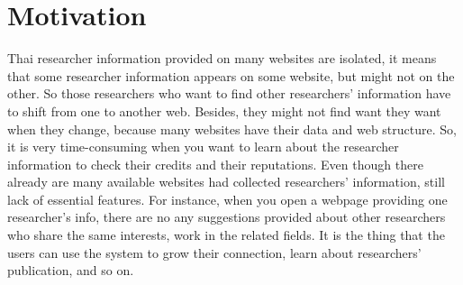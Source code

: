 \section{Motivation}
\label{sec:motivation}

Thai researcher information provided on many websites are isolated, it means that some researcher information appears on some website, but might not on the other. So those researchers who want to find other researchers' information have to shift from one to another web. Besides, they might not find want they want when they change, because many websites have their data and web structure. So, it is very time-consuming when you want to learn about the researcher information to check their credits and their reputations. Even though there already are many available websites had collected researchers' information, still lack of essential features. For instance, when you open a webpage providing one researcher's info, there are no any suggestions provided about other researchers who share the same interests, work in the related fields. It is the thing that the users can use the system to grow their connection, learn about researchers' publication, and so on.
